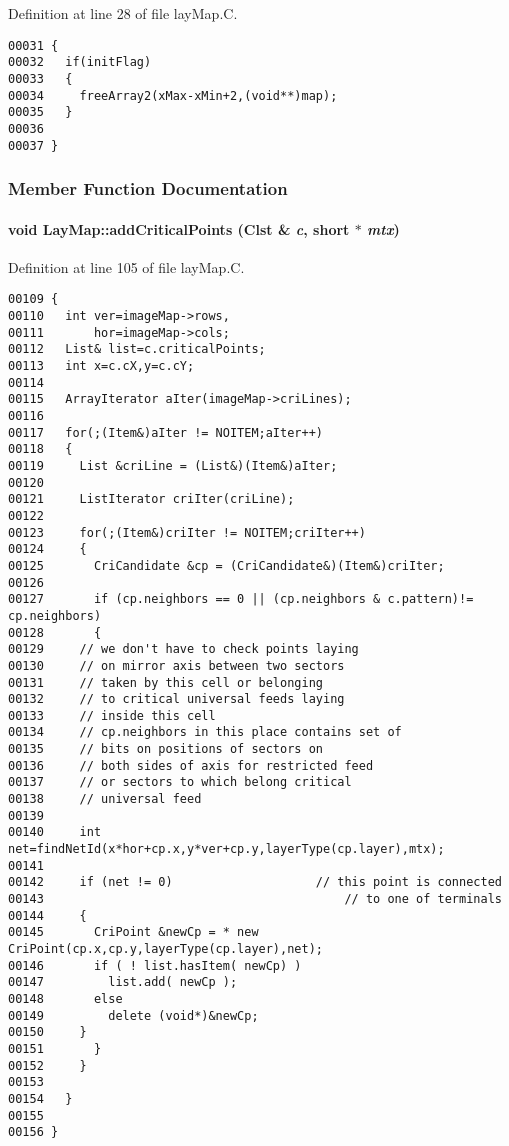 Definition at line 28 of file lay\-Map.C.\small\begin{verbatim}00031 {
00032   if(initFlag)
00033   {
00034     freeArray2(xMax-xMin+2,(void**)map);
00035   }
00036 
00037 }
\end{verbatim}\normalsize 


\subsubsection{Member Function Documentation}
\label{LayMap_a4}
\paragraph{\setlength{\rightskip}{0pt plus 5cm}void Lay\-Map::add\-Critical\-Points ({\bf Clst} \& {\em c}, short $\ast$ {\em mtx})}\hfill



Definition at line 105 of file lay\-Map.C.\small\begin{verbatim}00109 {
00110   int ver=imageMap->rows,
00111       hor=imageMap->cols;
00112   List& list=c.criticalPoints;
00113   int x=c.cX,y=c.cY;
00114 
00115   ArrayIterator aIter(imageMap->criLines);
00116   
00117   for(;(Item&)aIter != NOITEM;aIter++)
00118   {
00119     List &criLine = (List&)(Item&)aIter;
00120 
00121     ListIterator criIter(criLine);
00122     
00123     for(;(Item&)criIter != NOITEM;criIter++)
00124     {
00125       CriCandidate &cp = (CriCandidate&)(Item&)criIter;
00126       
00127       if (cp.neighbors == 0 || (cp.neighbors & c.pattern)!= cp.neighbors)
00128       {
00129     // we don't have to check points laying
00130     // on mirror axis between two sectors
00131     // taken by this cell or belonging
00132     // to critical universal feeds laying
00133     // inside this cell
00134     // cp.neighbors in this place contains set of
00135     // bits on positions of sectors on
00136     // both sides of axis for restricted feed
00137     // or sectors to which belong critical
00138     // universal feed
00139     
00140     int net=findNetId(x*hor+cp.x,y*ver+cp.y,layerType(cp.layer),mtx);
00141     
00142     if (net != 0)                    // this point is connected
00143                                          // to one of terminals
00144     {
00145       CriPoint &newCp = * new CriPoint(cp.x,cp.y,layerType(cp.layer),net);
00146       if ( ! list.hasItem( newCp) )
00147         list.add( newCp );
00148       else
00149         delete (void*)&newCp;
00150     } 
00151       }      
00152     }
00153     
00154   }
00155 
00156 }
\end{verbatim}\normalsize 
\label{LayMap_c5}

